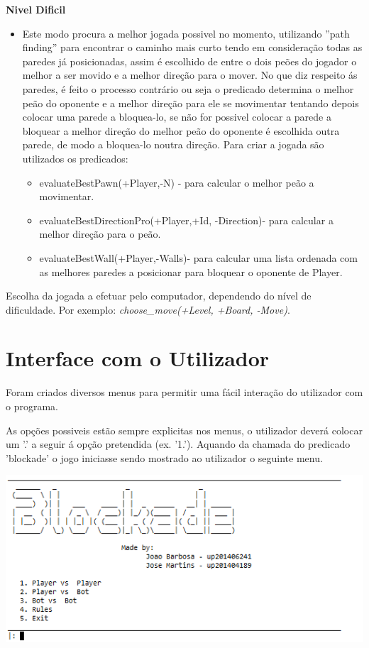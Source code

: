 \documentclass[a4paper]{article}
\begin{document}
\textbf{Nivel Dificil}
\begin{itemize}
\item Este modo procura a melhor jogada possivel no momento, utilizando ''path finding'' para encontrar o caminho mais curto tendo em consideração todas as paredes já posicionadas, assim é escolhido de entre o dois peões do jogador o melhor a ser movido e a melhor direção para o mover.
No que diz respeito ás paredes, é feito o processo contrário ou seja o predicado determina o melhor peão do oponente e a melhor direção para ele se movimentar tentando depois colocar uma parede a bloquea-lo, se não for possivel colocar a parede a bloquear a melhor direção do melhor peão do oponente é escolhida outra parede, de modo a bloquea-lo noutra direção.
 Para criar a jogada são utilizados os predicados:
 \begin{itemize}
		\item evaluateBestPawn(+Player,-N) - para calcular o melhor peão a movimentar.
		\item evaluateBestDirectionPro(+Player,+Id, -Direction)-  para calcular a melhor direção para o peão.
		\item evaluateBestWall(+Player,-Walls)- para calcular uma lista ordenada com as melhores paredes a posicionar para bloquear o oponente de Player.
	\end{itemize}
\end{itemize}







Escolha da jogada a efetuar pelo computador, dependendo do nível de dificuldade. Por exemplo: \textit{choose\_move(+Level, +Board, -Move)}.


\newpage
\section{Interface com o Utilizador}


Foram criados diversos menus para permitir uma fácil interação do utilizador com o programa.
\par As opções possiveis estão sempre explicitas nos menus, o utilizador deverá colocar um '.' a seguir á opção pretendida  (ex. '1.').
Aquando da chamada do predicado 'blockade' o jogo iniciasse sendo mostrado ao utilizador o seguinte menu.

\begin{center}
	\includegraphics[scale = 0.7]{fig5.png}
\end{center}
\end{document}
